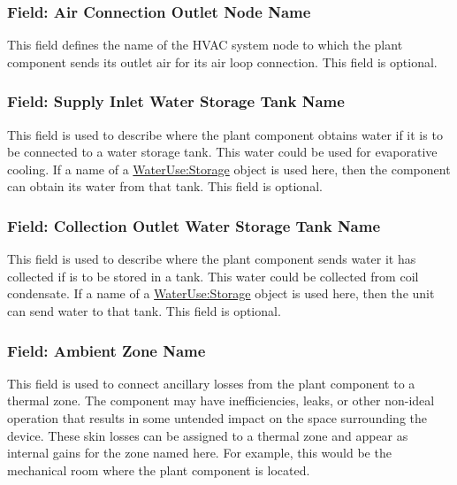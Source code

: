 \subsubsection{Field: Air Connection Outlet Node Name}\label{field-air-connection-outlet-node-name}

This field defines the name of the HVAC system node to which the plant component sends its outlet air for its air loop connection. This field is optional.

\subsubsection{Field: Supply Inlet Water Storage Tank Name}\label{field-supply-inlet-water-storage-tank-name-3}

This field is used to describe where the plant component obtains water if it is to be connected to a water storage tank. This water could be used for evaporative cooling. If a name of a \hyperref[waterusestorage]{WaterUse:Storage} object is used here, then the component can obtain its water from that tank. This field is optional.

\subsubsection{Field: Collection Outlet Water Storage Tank Name}\label{field-collection-outlet-water-storage-tank-name-3}

This field is used to describe where the plant component sends water it has collected if is to be stored in a tank. This water could be collected from coil condensate. If a name of a \hyperref[waterusestorage]{WaterUse:Storage} object is used here, then the unit can send water to that tank. This field is optional.

\subsubsection{Field: Ambient Zone Name}\label{field-ambient-zone-name-3}

This field is used to connect ancillary losses from the plant component to a thermal zone. The component may have inefficiencies, leaks, or other non-ideal operation that results in some untended impact on the space surrounding the device. These skin losses can be assigned to a thermal zone and appear as internal gains for the zone named here. For example, this would be the mechanical room where the plant component is located.

